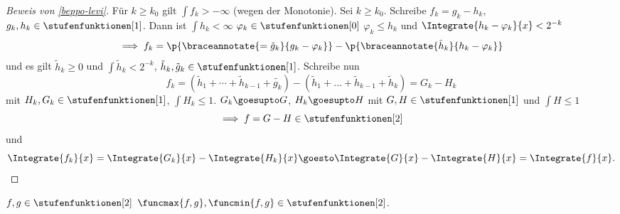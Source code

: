\begin{proof}[Beweis von \ref{beppo-levi}]
  Für \( k\geq k_0 \) gilt \( \int f_k>-\infty \) (wegen der Monotonie). Sei \( k\geq k_0 \). Schreibe \( f_k=g_k-h_k \), \( g_k,h_k\in \stufenfunktionen[1] \). Dann ist \( \int h_k<\infty \) \timplies \texists \( \varphi_k\in \stufenfunktionen[0] \) \sd \( \varphi_k\leq h_k \) und \( \Integrate{h_k-\varphi_k}{x}<2^{-k} \)
  \begin{equation*}
    \implies f_k=\p{\braceannotate{=\tilde{g}_k}{g_k-\varphi_k}}-\p{\braceannotate{\tilde{h}_k}{h_k-\varphi_k}}
  \end{equation*}
  und es gilt \( \tilde{h}_k\geq 0 \) und \( \int \tilde{h}_k<2^{-k} \), \( \tilde{h}_k,\tilde{g}_k\in \stufenfunktionen[1] \).
  Schreibe nun
  \begin{equation*}
    f_k=(\tilde{h}_1+\dotsb+\tilde{h}_{k-1}+\tilde{g_k})-(\tilde{h}_1+\dotsc+\tilde{h}_{k-1}+\tilde{h}_k)=G_k-H_k
  \end{equation*}
  mit \( H_k,G_k\in \stufenfunktionen[1] \), \( \int H_k\leq 1 \).  \timplies \( G_k\goesupto G \), \( H_k\goesupto H \) mit \( G,H\in \stufenfunktionen[1] \) und \( \int H\leq 1 \)
  \begin{equation*}
    \implies f=G-H\in \stufenfunktionen[2]
  \end{equation*}
  und
  \begin{equation*}
    \Integrate{f_k}{x}=\Integrate{G_k}{x}-\Integrate{H_k}{x}\goesto \Integrate{G}{x}-\Integrate{H}{x}=\Integrate{f}{x}.
  \end{equation*}
\end{proof}
\begin{folgerung}\label{max_min_von_r2_ist_r2}
  \( f,g\in \stufenfunktionen[2] \) \timplies \( \funcmax{f,g},\funcmin{f,g}\in \stufenfunktionen[2] \).
\end{folgerung} 
